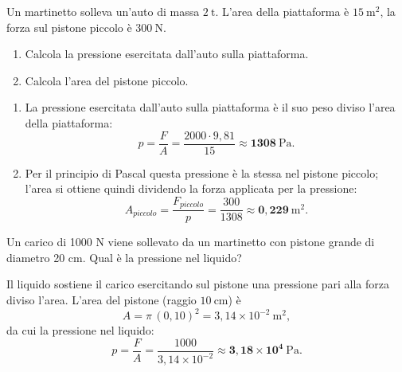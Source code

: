 \begin{question}[ID=4.3, subtitle={Martinetto che solleva un'auto da 2 tonnellate}, tags={fluidi, Pascal, martinetto}, difficulty=media]
Un martinetto solleva un'auto di massa $2\ \mathrm{t}$. L'area della piattaforma è $15\ \mathrm{m^2}$, la forza sul pistone piccolo è $300\ \mathrm{N}$.
\begin{enumerate}
    \item Calcola la pressione esercitata dall'auto sulla piattaforma.
    \item Calcola l'area del pistone piccolo.
\end{enumerate}
\begin{solution}
\begin{enumerate}
    \item La pressione esercitata dall'auto sulla piattaforma è il suo peso diviso l'area della piattaforma:
    \[
    p = \frac{F}{A} = \frac{2000\cdot 9{,}81}{15} \approx \mathbf{1308\ \mathrm{Pa}}.
    \]
    \item Per il principio di Pascal questa pressione è la stessa nel pistone piccolo; l'area si ottiene quindi dividendo la forza applicata per la pressione:
    \[
    A_{piccolo} = \frac{F_{piccolo}}{p} = \frac{300}{1308} \approx \mathbf{0{,}229\ \mathrm{m^2}}.
    \]
\end{enumerate}
\end{solution}
\end{question}


\begin{question}[ID=4.4, subtitle={Pressione nel martinetto per sollevare 1000 N}, tags={fluidi, Pascal}, difficulty=facile]
Un carico di 1000 N viene sollevato da un martinetto con pistone grande di diametro 20 cm. Qual è la pressione nel liquido?
\begin{solution}
Il liquido sostiene il carico esercitando sul pistone una pressione pari alla forza diviso l'area. L'area del pistone (raggio $10\ \mathrm{cm}$) è
\[
A = \pi\,(0{,}10)^2 = 3{,}14\times10^{-2}\ \mathrm{m^2},
\]
da cui la pressione nel liquido:
\[
p = \frac{F}{A} = \frac{1000}{3{,}14\times10^{-2}} \approx \mathbf{3{,}18\times10^{4}\ \mathrm{Pa}}.
\]
\end{solution}
\end{question}


